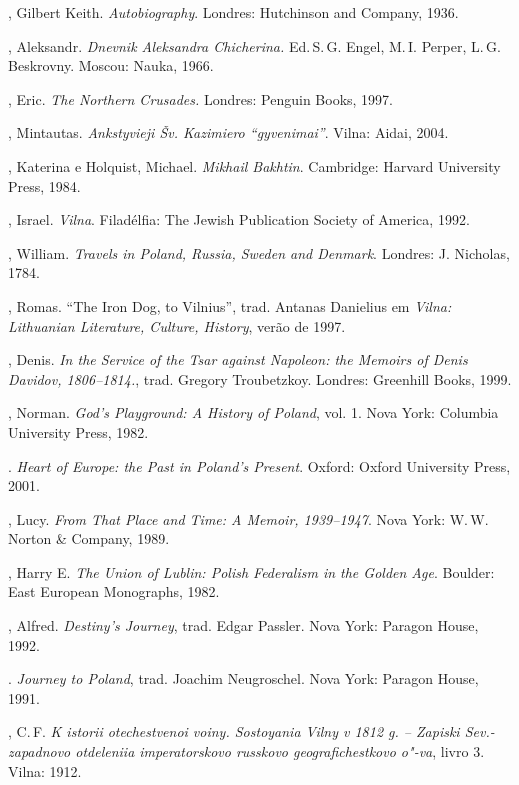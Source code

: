 \begin{bibliohedra}
  , Gilbert Keith. \textit{Autobiography}. Londres: Hutchinson
  and Company, 1936.

  , Aleksandr. \textit{Dnevnik Aleksandra Chicherina.} Ed.\,S.\,G.
  Engel, M.\,I. Perper, L.\,G. Beskrovny. Moscou: Nauka, 1966.

  , Eric. \textit{The Northern Crusades.} Londres: Penguin
  Books, 1997.

  , Mintautas. \textit{Ankstyvieji Šv. Kazimiero
  ``gyvenimai''}. Vilna: Aidai, 2004.

  , Katerina e Holquist, Michael. \textit{Mikhail Bakhtin}.
  Cambridge: Harvard University Press, 1984.

  , Israel. \textit{Vilna}. Filadélfia: The Jewish Publication
  Society of America, 1992.

  , William. \textit{Travels in Poland, Russia, Sweden and Denmark}.
  Londres: J. Nicholas, 1784.

  , Romas. ``The Iron Dog, to Vilnius'', trad. Antanas
  Danielius em \textit{Vilna: Lithuanian Literature, Culture, History},
  verão de 1997.

  , Denis. \textit{In the Service of the Tsar against Napoleon: the
  Memoirs of Denis Davidov, 1806--1814.}, trad. Gregory Troubetzkoy.
  Londres: Greenhill Books, 1999.

  , Norman. \textit{God's Playground: A History of Poland}, vol. 1.
  Nova York: Columbia University Press, 1982.

  \titidem. \textit{Heart of Europe: the Past in Poland's Present}.
  Oxford: Oxford University Press, 2001.

  , Lucy. \textit{From That Place and Time: A Memoir,
  1939--1947}. Nova York: W.\,W. Norton \& Company, 1989.

  , Harry E. \textit{The Union of Lublin: Polish Federalism in
  the Golden Age}. Boulder: East European Monographs, 1982.

  , Alfred. \textit{Destiny's Journey}, trad. Edgar Passler. Nova
  York: Paragon House, 1992.

  \titidem. \textit{Journey to Poland}, trad. Joachim Neugroschel.
  Nova York: Paragon House, 1991.

  , C.\,F. \textit{K istorii otechestvenoi voiny. Sostoyania
  Vilny v 1812 g. -- Zapiski Sev.-zapadnovo otdeleniia imperatorskovo
  russkovo geografichestkovo o"-va}, livro 3. Vilna: 1912.


\end{bibliohedra}
